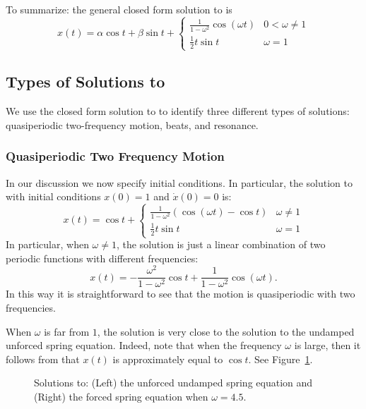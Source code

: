 \documentclass{ximera}
\begin{document}
To summarize: the general closed form solution to  is
\begin{equation}  \label{eq:uspfsoln}
x(t) = \alpha\cos t+\beta\sin t + \left\{\begin{array}{lr}
\frac{1}{1-\omega ^2}\cos(\omega t)  & 0<\omega\neq 1\\  
\frac{1}{2}t\sin t & \omega=1 \end{array}\right.\end{equation}

\subsection*{Types of Solutions to }

We use the closed form solution  to  to
identify three different types of solutions: quasiperiodic two-frequency 
motion, beats, and resonance.

\subsubsection*{Quasiperiodic Two Frequency Motion}

In our discussion we now specify initial conditions.  In particular, the 
solution to  with initial conditions $x(0)=1$ and 
$\dot{x}(0)=0$ is:
\arraystart
\begin{equation}  \label{e:x(t)reson}
x(t) = \cos t + \left\{\begin{array}{ll}
\frac{1}{1-\omega ^2}(\cos(\omega t)-\cos t) & \omega \neq 1 \\
\frac{1}{2}t\sin t & \omega=1  \end{array}\right.
\end{equation}
\arrayfinish
In particular, when $\omega\neq 1$, the solution  is
just a linear combination of two periodic 
functions with different 
frequencies:
\begin{equation} \label{e:x(t)reson2}
x(t) = -\frac{\omega^2}{1-\omega ^2} \cos t + \frac{1}{1-\omega ^2}\cos(\omega t).
\end{equation}
In this way it is straightforward to see that the motion is 
quasiperiodic
with two frequencies.

When $\omega$ is far from $1$, the solution is very close to the solution
to the undamped unforced spring equation.  
Indeed, note that when the frequency
$\omega$ is large, then it follows from  that $x(t)$ is 
approximately equal to $\cos t$.  See Figure~\ref{F:nonreson}.
\begin{figure}[htb]
           \centerline{%
           }
           \caption{Solutions to: (Left) the unforced undamped spring
        equation and (Right) the forced spring equation when $\omega =4.5$.}
           \label{F:nonreson}
\end{figure}
\end{document}
